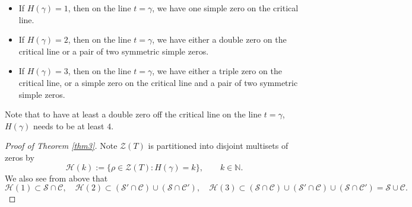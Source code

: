 \documentclass[11pt]{amsart}
\theoremstyle{remark}
\theoremstyle{plain}
\numberwithin{equation}{section}
\begin{document}
\begin{itemize}
    \item If $H(\gamma)=1$, then on the line $t=\gamma$, we have one simple zero on the critical line.
    \item If $H(\gamma)=2$, then on the line $t=\gamma$, we have either a double zero on the critical line or a pair of two symmetric simple zeros. 
    \item If $H(\gamma)=3$, then on the line $t=\gamma$, we have either a triple zero on the critical line, or a simple zero on the critical line and a pair of two symmetric simple zeros.
\end{itemize}
Note that to have at least a double zero off the critical line on the line $t=\gamma$, $H(\gamma)$ needs to be at least $4$.

\begin{proof}[Proof of Theorem \ref{thm3}]
Note $\mathcal{Z}(T)$ is partitioned into disjoint multisets of zeros by 
\[ \mathcal{H}(k) := \{\rho \in \mathcal{Z}(T): H(\gamma)=k\}, \qquad k\in \mathbb{N}. \] 
We also see from above that 
\[
\mathcal{H}(1) \subset \mathcal{S}\cap\mathcal{C},\quad
\mathcal{H}(2) \subset (\mathcal{S'}\cap\mathcal{C})\cup (\mathcal{S}\cap\mathcal{C'}),\quad
\mathcal{H}(3) \subset (\mathcal{S}\cap \mathcal{C})\cup(\mathcal{S'}\cap \mathcal{C})\cup (\mathcal{S}\cap\mathcal{C'})
= \mathcal{S}\cup\mathcal{C}.
\]


\end{proof}
\end{document}
